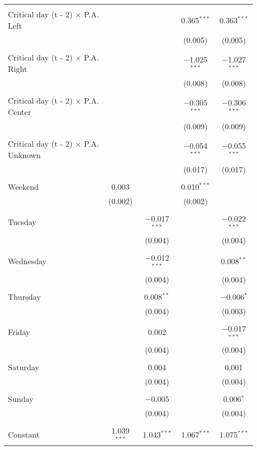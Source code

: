 \documentclass[
]{article}
\begin{document}
\begin{table}[!htbp]
{\begin{tabular}{@{\extracolsep{5pt}}lcccc}
  & & & & \\ 
 Critical day (t - 2) $\times$ P.A. Left &  &  & 0.365$^{***}$ & 0.363$^{***}$ \\ 
  &  &  & (0.005) & (0.005) \\ 
  & & & & \\ 
 Critical day (t - 2) $\times$ P.A. Right &  &  & $-$1.025$^{***}$ & $-$1.027$^{***}$ \\ 
  &  &  & (0.008) & (0.008) \\ 
  & & & & \\ 
 Critical day (t - 2) $\times$ P.A. Center &  &  & $-$0.305$^{***}$ & $-$0.306$^{***}$ \\ 
  &  &  & (0.009) & (0.009) \\ 
  & & & & \\ 
 Critical day (t - 2) $\times$ P.A. Unknown &  &  & $-$0.054$^{***}$ & $-$0.055$^{***}$ \\ 
  &  &  & (0.017) & (0.017) \\ 
  & & & & \\ 
 Weekend & 0.003 &  & 0.010$^{***}$ &  \\ 
  & (0.002) &  & (0.002) &  \\ 
  & & & & \\ 
 Tuesday &  & $-$0.017$^{***}$ &  & $-$0.022$^{***}$ \\ 
  &  & (0.004) &  & (0.004) \\ 
  & & & & \\ 
 Wednesday &  & $-$0.012$^{***}$ &  & 0.008$^{**}$ \\ 
  &  & (0.004) &  & (0.004) \\ 
  & & & & \\ 
 Thursday &  & 0.008$^{**}$ &  & $-$0.006$^{*}$ \\ 
  &  & (0.004) &  & (0.003) \\ 
  & & & & \\ 
 Friday &  & 0.002 &  & $-$0.017$^{***}$ \\ 
  &  & (0.004) &  & (0.004) \\ 
  & & & & \\ 
 Saturday &  & 0.004 &  & 0.001 \\ 
  &  & (0.004) &  & (0.004) \\ 
  & & & & \\ 
 Sunday &  & $-$0.005 &  & 0.006$^{*}$ \\ 
  &  & (0.004) &  & (0.004) \\ 
  & & & & \\ 
 Constant & 1.039$^{***}$ & 1.043$^{***}$ & 1.067$^{***}$ & 1.075$^{***}$ \\ 

\end{tabular}}
\end{table}
\end{document}
